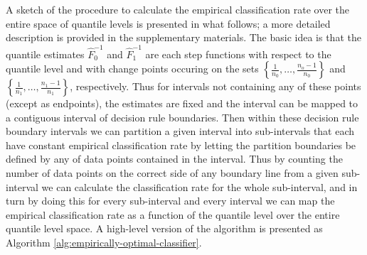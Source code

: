 A sketch of the procedure to calculate the empirical classification rate over
the entire space of quantile levels is presented in what follows; a more
detailed description is provided in the supplementary materials.  The basic idea
is that the quantile estimates $\hat{F}_0^{-1}$ and $\hat{F}_1^{-1}$ are each
step functions with respect to the quantile level and with change points
occuring on the sets $\left\{\frac{1}{n_0}, \dots, \frac{n_o - 1}{n_0}\right\}$
and $\left\{\frac{1}{n_1}, \dots, \frac{n_1 - 1}{n_1}\right\}$, respectively.
Thus for intervals not containing any of these points (except as endpoints), the
estimates are fixed and the interval can be mapped to a contiguous interval of
decision rule boundaries.  Then within these decision rule boundary intervals we
can partition a given interval into sub-intervals that each have constant
empirical classification rate by letting the partition boundaries be defined by
any of data points contained in the interval.  Thus by counting the number of
data points on the correct side of any boundary line from a given sub-interval
we can calculate the classification rate for the whole sub-interval, and in turn
by doing this for every sub-interval and every interval we can map the empirical
classification rate as a function of the quantile level over the entire quantile
level space.  A high-level version of the algorithm is presented as Algorithm
\ref{alg:empirically-optimal-classifier}.

